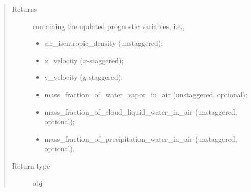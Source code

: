 \documentclass[letterpaper,10pt,english]{sphinxmanual}
\begin{document}
\begin{fulllineitems}
\begin{fulllineitems}
\begin{quote}
\begin{description}
\begin{itemize}
\end{itemize}

\item[{Returns}] \leavevmode

{\hyperref[\detokenize{api:storages.state_isentropic.StateIsentropic}]{}} containing the updated prognostic variables, i.e.,
\begin{itemize}
\item {} 
air\_isentropic\_density (unstaggered);

\item {} 
x\_velocity (\(x\)-staggered);

\item {} 
y\_velocity (\(y\)-staggered);

\item {} 
mass\_fraction\_of\_water\_vapor\_in\_air (unstaggered, optional);

\item {} 
mass\_fraction\_of\_cloud\_liquid\_water\_in\_air (unstaggered, optional);

\item {} 
mass\_fraction\_of\_precipitation\_water\_in\_air (unstaggered, optional).

\end{itemize}


\item[{Return type}] \leavevmode
obj

\end{description}\end{quote}

\end{fulllineitems}


\end{fulllineitems}

\end{document}
